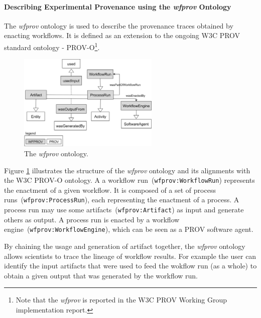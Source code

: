 \paragraph{Describing Experimental Provenance using the \textit{wfprov} Ontology}
The \textit{wfprov} ontology is used to describe the provenance traces obtained by enacting  workflows. It is defined as an extension to the ongoing W3C PROV standard ontology - PROV-O\footnote{Note that the \textit{wfprov} is reported in the W3C PROV Working Group implementation report.}.

\begin{figure}[ht]
  \centering
  \includegraphics[width=0.6\textwidth]{Figures/wfprov.png}
  \caption{The \textit{wfprov} ontology.}
  \label{fig:wfprov}
\end{figure}

Figure \ref{fig:wfprov} illustrates the structure of the \textit{wfprov} ontology and its alignments with the W3C PROV-O ontology. A a workflow run~(\texttt{wfprov:WorkflowRun}) represents the enactment of a given workflow. It is composed of a set of process runs~(\texttt{wfprov:ProcessRun}), each representing the enactment of a process. A process run may use some artifacts~(\texttt{wfprov:Artifact}) as input and generate others as output. A process run is enacted by a workflow engine~(\texttt{wfprov:WorkflowEngine}), which can be seen as a PROV software agent.

By chaining the usage and generation of artifact together, the \textit{wfprov} ontology allows scientists to trace the lineage of workflow results. For example the user can identify the input artifacts that were used to feed the wokflow run (as a whole) to obtain a given output that was generated by the workflow run.

